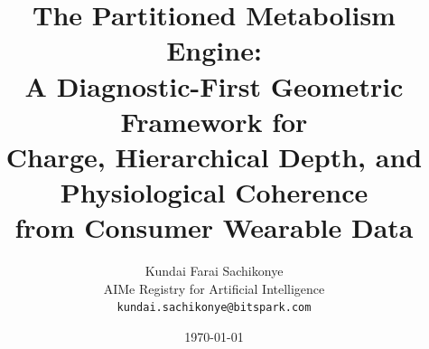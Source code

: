 \documentclass[11pt,twocolumn,a4paper]{article}
\theoremstyle{definition}
\theoremstyle{remark}
\begin{document}
\title{\textbf{The Partitioned Metabolism Engine: \\
A Diagnostic-First Geometric Framework for \\
Charge, Hierarchical Depth, and Physiological Coherence \\
from Consumer Wearable Data}}

\author{
Kundai Farai Sachikonye\\[0.3em]
AIMe Registry for Artificial Intelligence\\[0.3em]
\texttt{kundai.sachikonye@bitspark.com}
}

\date{\today}

\maketitle
\end{document}
